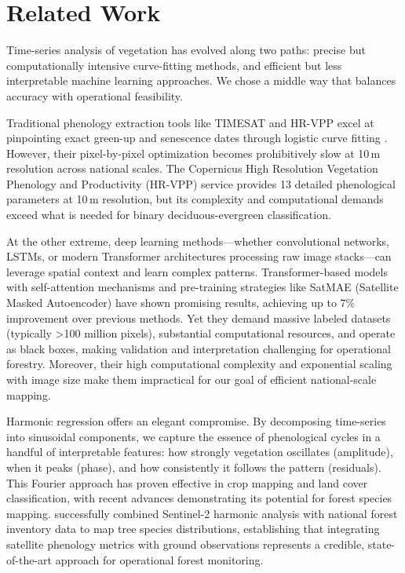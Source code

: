 \documentclass[utf8]{FrontiersinHarvard}
\begin{document}
\section{Related Work}

Time-series analysis of vegetation has evolved along two paths: precise but computationally intensive curve-fitting methods, and efficient but less interpretable machine learning approaches. We chose a middle way that balances accuracy with operational feasibility.

Traditional phenology extraction tools like TIMESAT and HR-VPP excel at pinpointing exact green-up and senescence dates through logistic curve fitting \citep{JonssonEklundh2002, EU2024b}. However, their pixel-by-pixel optimization becomes prohibitively slow at 10\,m resolution across national scales. The Copernicus High Resolution Vegetation Phenology and Productivity (HR-VPP) service provides 13 detailed phenological parameters at 10\,m resolution, but its complexity and computational demands exceed what is needed for binary deciduous-evergreen classification.

At the other extreme, deep learning methods—whether convolutional networks, LSTMs, or modern Transformer architectures processing raw image stacks—can leverage spatial context and learn complex patterns. Transformer-based models with self-attention mechanisms and pre-training strategies like SatMAE (Satellite Masked Autoencoder) \citep{Cong2022} have shown promising results, achieving up to 7\% improvement over previous methods. Yet they demand massive labeled datasets (typically >100 million pixels), substantial computational resources, and operate as black boxes, making validation and interpretation challenging for operational forestry. Moreover, their high computational complexity and exponential scaling with image size make them impractical for our goal of efficient national-scale mapping.

Harmonic regression offers an elegant compromise. By decomposing time-series into sinusoidal components, we capture the essence of phenological cycles in a handful of interpretable features: how strongly vegetation oscillates (amplitude), when it peaks (phase), and how consistently it follows the pattern (residuals). This Fourier approach has proven effective in crop mapping and land cover classification, with recent advances demonstrating its potential for forest species mapping. \citet{Francini2024} successfully combined Sentinel-2 harmonic analysis with national forest inventory data to map tree species distributions, establishing that integrating satellite phenology metrics with ground observations represents a credible, state-of-the-art approach for operational forest monitoring.
\end{document}
